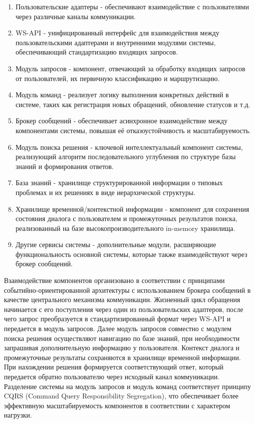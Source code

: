 \begin{enumerate}[label=\arabic*.]
    \item Пользовательские адаптеры - обеспечивают взаимодействие с пользователями через различные каналы коммуникации.
    \item WS-API - унифицированный интерфейс для взаимодействия между пользовательскими адаптерами и внутренними модулями системы, обеспечивающий стандартизацию входящих запросов.
    \item Модуль запросов - компонент, отвечающий за обработку входящих запросов от пользователей, их первичную классификацию и маршрутизацию.
    \item Модуль команд - реализует логику выполнения конкретных действий в системе, таких как регистрация новых обращений, обновление статусов и т.д.
    \item Брокер сообщений - обеспечивает асинхронное взаимодействие между компонентами системы, повышая её отказоустойчивость и масштабируемость.
    \item Модуль поиска решения - ключевой интеллектуальный компонент системы, реализующий алгоритм последовательного углубления по структуре базы знаний и формирования ответов.
    \item База знаний - хранилище структурированной информации о типовых проблемах и их решениях в виде иерархической структуры.
    \item Хранилище временной/контекстной информации - компонент для сохранения состояния диалога с пользователем и промежуточных результатов поиска, реализованный на базе высокопроизводительного in-memory хранилища.
    \item Другие сервисы системы - дополнительные модули, расширяющие функциональность основной системы, которые также взаимодействуют через брокер сообщений.
\end{enumerate}

Взаимодействие компонентов организовано в соответствии с принципами событийно-ориентированной архитектуры с использованием брокера сообщений в качестве центрального механизма коммуникации. Жизненный цикл обращения начинается с его поступления через один из пользовательских адаптеров, после чего запрос преобразуется в стандартизированный формат через WS-API и передается в модуль запросов. Далее модуль запросов совместно с модулем поиска решения осуществляют навигацию по базе знаний, при необходимости запрашивая дополнительную информацию у пользователя. Контекст диалога и промежуточные результаты сохраняются в хранилище временной информации. При нахождении решения формируется соответствующий ответ, который передается обратно пользователю через исходный канал коммуникации.
Разделение системы на модуль запросов и модуль команд соответствует принципу CQRS (Command Query Responsibility Segregation), что обеспечивает более эффективную масштабируемость компонентов в соответствии с характером нагрузки.

